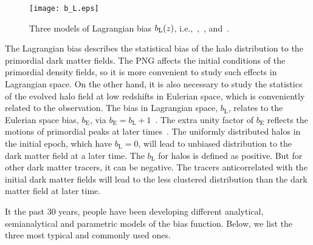 \documentclass[twocolumn,floatfix,nofootinbib,aps,reprint]{revtex4}
\begin{document}
\begin{figure}[htp]
    \centering
    \texttt{[image: b\_L.eps]}
    \vspace{-0.6cm}
    \caption{Three models of Lagrangian bias $b_{\rm L}(z)$, i.e.,~\citet{2008ApJ...677L..77M},~\citet{1996MNRAS.282..347M}, and~\citet{2002MNRAS.336..112M}.}\label{fig:bhi}
\end{figure}
The Lagrangian bias describes the statistical bias of the halo distribution 
to the primordial dark matter fields. 
The PNG affects the initial conditions of
the primordial density fields, so it is more convenient to study such 
effects in Lagrangian space. 
On the other hand, it is also necessary to study the statistics of the 
evolved halo field at low redshifts in Eulerian space, which is conveniently
related to the observation.
The bias in Lagrangian space, $b_\mathrm{L}$,
relates to the Eulerian space bias, $b_\mathrm{E}$, via 
$b_\mathrm{E} = b_\mathrm{L} + 1$~\cite{1996MNRAS.282..347M}.
The extra unity factor of $b_\mathrm{E}$ reflects the motions of 
primordial peaks at later times~\cite{2013MNRAS.436.2029M}. 
The uniformly distributed halos in the initial epoch,
which have $b_\mathrm{L}=0$, will lead to unbiased distribution 
to the dark matter field at a later time. 
The $b_\mathrm{L}$ for halos is defined as positive. But for other
dark matter tracers, it can be negative. The tracers anticorrelated 
with the initial dark matter fields will lead to the less clustered
distribution than the dark matter field at later time.

It the past $30$ years, people have 
been developing different analytical, semianalytical and parametric models 
of the bias function. Below, we list the three most typical and 
commonly used ones.
\end{document}
